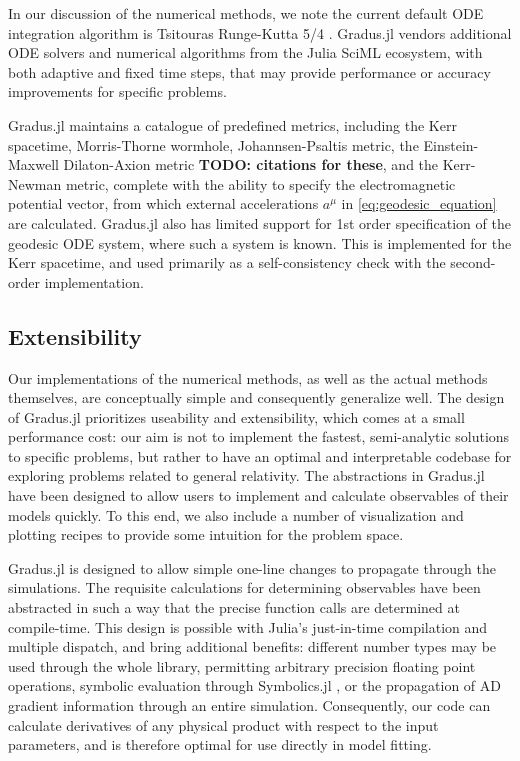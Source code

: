 \documentclass[fleqn,usenatbib]{mnras}
\newcommand{\todo}[1]{{\noindent \bf \color{red} TODO: #1}}
\newcommand{\Gradus}{Gradus.jl }
\begin{document}
In our discussion of the numerical methods, we note the current default ODE integration algorithm is Tsitouras Runge-Kutta 5/4 \citep{tsitouras_rungekutta_2011}. \Gradus vendors additional ODE solvers and numerical algorithms from the Julia SciML ecosystem, with both adaptive and fixed time steps, that may provide performance or accuracy improvements for specific problems.

\Gradus maintains a catalogue of predefined metrics, including the Kerr spacetime, Morris-Thorne wormhole, Johannsen-Psaltis metric, the Einstein-Maxwell Dilaton-Axion metric \todo{citations for these}, and the Kerr-Newman metric, complete with the ability to specify the electromagnetic potential vector, from which external accelerations $a^\mu$ in \eqref{eq:geodesic_equation} are calculated. \Gradus also has limited support for 1st order specification of the geodesic ODE system, where such a system is known. This is implemented for the Kerr spacetime, and used primarily as a self-consistency check with the second-order implementation.

\subsection{Extensibility}

Our implementations of the numerical methods, as well as the actual methods themselves, are conceptually simple and consequently generalize well. The design of \Gradus prioritizes useability and extensibility, which comes at a small performance cost: our aim is not to implement the fastest, semi-analytic solutions to specific problems, but rather to have an optimal and interpretable codebase for exploring problems related to general relativity. The abstractions in \Gradus have been designed to allow users to implement and calculate observables of their models quickly. To this end, we also include a number of visualization and plotting recipes to provide some intuition for the problem space.

\Gradus is designed to allow simple one-line changes to propagate through the simulations. The requisite calculations for determining observables have been abstracted in such a way that the precise function calls are determined at compile-time. This design is possible with Julia's just-in-time compilation and multiple dispatch, and bring additional benefits: different number types may be used through the whole library, permitting arbitrary precision floating point operations, symbolic evaluation through Symbolics.jl \citep{symbolics_julia}, or the propagation of AD gradient information through an entire simulation. Consequently, our code can calculate derivatives of any physical product with respect to the input parameters, and is therefore optimal for use directly in model fitting.
\end{document}
